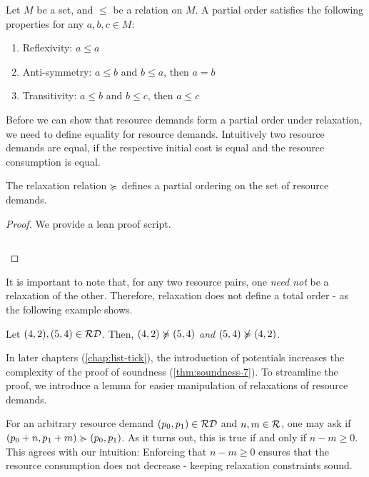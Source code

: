 \begin{definition}
   Let \(M\) be a set, and \(\leq\) be a relation on \(M\). A partial order satisfies the following properties for any \(a, b, c \in M\):
   \begin{enumerate}[label=\Roman*]
      \item Reflexivity: \(a \leq a \) 
      \item Anti-symmetry: \(a \leq b\) and \(b \leq a\), then \(a = b\) 
      \item Transitivity: \(a \leq b\) and \(b \leq c\), then \(a \leq c\)
   \end{enumerate}
\end{definition}

Before we can show that resource demands form a partial order under relaxation, we need to define equality for resource demands. Intuitively two resource demands are equal, if the respective initial cost is equal and the resource consumption is equal. 

\begin{lemma}
   The relaxation relation \(\succcurlyeq\) defines a partial ordering on the set of resource demands.
\end{lemma}

\begin{proof}
   We provide a lean proof script.
   \inputminted{lean}{formal-proofs/Resources/Relaxation_PO.lean}
\end{proof}

It is important to note that, for any two resource pairs, one \emph{need not} be a relaxation of the other. Therefore, relaxation does not define a total order - as the following example shows.

\begin{example}
   Let \((4,2), (5,4) \in \mathcal{RD}\). Then, \((4,2) \notrelaxation (5,4)\) \emph{and} \((5,4) \notrelaxation (4,2)\).
\end{example}

In later chapters (\cref{chap:list-tick}), the introduction of potentials increases the complexity of the proof of soundness (\cref{thm:soundness-7}). To streamline the proof, we introduce a lemma for easier manipulation of relaxations of resource demands.

For an arbitrary resource demand \((p_0, p_1) \in \mathcal{RD}\) and \(n, m \in \mathcal{R}\), one may ask if \((p_0 + n, p_1 + m) \succcurlyeq (p_0, p_1)\). As it turns out, this is true if and only if \(n - m \geq 0\). This agrees with our intuition: Enforcing that \(n - m \geq 0\) ensures that the resource consumption does not decrease - keeping relaxation constraints sound.

